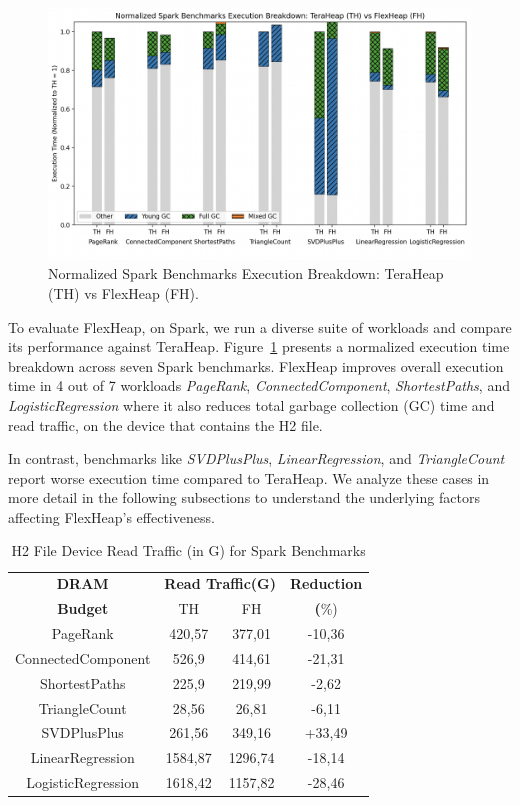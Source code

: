 \begin{figure}[t]
    \centering
    \includegraphics[width=\linewidth]{fig/spark_benchmarks.png}
    \caption{Normalized Spark Benchmarks Execution Breakdown: TeraHeap (TH) vs FlexHeap (FH).}
    \label{fig:spark-eval}
\end{figure}

To evaluate FlexHeap, on Spark,  we run a diverse suite of workloads and compare its performance against TeraHeap. 
Figure~\ref{fig:spark-eval} presents a normalized execution time breakdown across seven Spark benchmarks. 
FlexHeap improves overall execution time in 4 out of 7 workloads \textit{PageRank}, \textit{ConnectedComponent},
\textit{ShortestPaths}, and \textit{LogisticRegression} where it also reduces total garbage collection (GC) time and read traffic, 
on the device that contains the H2 file.

In contrast, benchmarks like \textit{SVDPlusPlus}, \textit{LinearRegression}, and \textit{TriangleCount} report worse execution time compared to TeraHeap.
We analyze these cases in more detail in the following subsections to understand the underlying factors affecting FlexHeap’s effectiveness.

\begin{table}[h]
\centering
\caption{H2 File Device Read Traffic (in G) for Spark Benchmarks}
\label{tab:spark-h2-traffic}
\begin{tabular}{|c|cc|c|}
\hline
\textbf{DRAM} & \multicolumn{2}{c|}{\textbf{Read Traffic(G)}} & \textbf{Reduction} \\
\textbf{Budget} & TH & FH & \textbf(\%)\\
\hline
        PageRank              & 420,57  & 377,01 & -10,36 \\
        ConnectedComponent    & 526,9  & 414,61  & -21,31 \\
        ShortestPaths         & 225,9  & 219,99 & -2,62 \\
        TriangleCount         & 28,56  & 26,81  & -6,11 \\
        SVDPlusPlus           & 261,56  & 349,16 & +33,49 \\
        LinearRegression      & 1584,87  & 1296,74 & -18,14 \\
        LogisticRegression    & 1618,42 & 1157,82 & -28,46 \\
\hline
\end{tabular}
\end{table}


